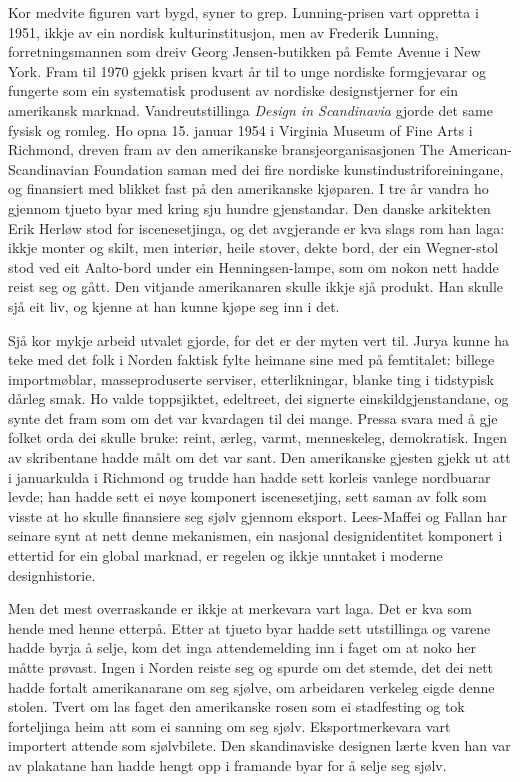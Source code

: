 Kor medvite figuren vart bygd, syner to grep. Lunning-prisen vart oppretta i 1951, ikkje av ein nordisk kulturinstitusjon, men av Frederik Lunning, forretningsmannen som dreiv Georg Jensen-butikken på Femte Avenue i New York. Fram til 1970 gjekk prisen kvart år til to unge nordiske formgjevarar og fungerte som ein systematisk produsent av nordiske designstjerner for ein amerikansk marknad. Vandreutstillinga \textit{Design in Scandinavia} gjorde det same fysisk og romleg. Ho opna 15. januar 1954 i Virginia Museum of Fine Arts i Richmond, dreven fram av den amerikanske bransjeorganisasjonen The American-Scandinavian Foundation saman med dei fire nordiske kunstindustriforeiningane, og finansiert med blikket fast på den amerikanske kjøparen. I tre år vandra ho gjennom tjueto byar med kring sju hundre gjenstandar. Den danske arkitekten Erik Herløw stod for iscenesetjinga, og det avgjerande er kva slags rom han laga: ikkje monter og skilt, men interiør, heile stover, dekte bord, der ein Wegner-stol stod ved eit Aalto-bord under ein Henningsen-lampe, som om nokon nett hadde reist seg og gått. Den vitjande amerikanaren skulle ikkje sjå produkt. Han skulle sjå eit liv, og kjenne at han kunne kjøpe seg inn i det.

Sjå kor mykje arbeid utvalet gjorde, for det er der myten vert til. Jurya kunne ha teke med det folk i Norden faktisk fylte heimane sine med på femtitalet: billege importmøblar, masseproduserte serviser, etterlikningar, blanke ting i tidstypisk dårleg smak. Ho valde toppsjiktet, edeltreet, dei signerte einskildgjenstandane, og synte det fram som om det var kvardagen til dei mange. Pressa svara med å gje folket orda dei skulle bruke: reint, ærleg, varmt, menneskeleg, demokratisk. Ingen av skribentane hadde målt om det var sant. Den amerikanske gjesten gjekk ut att i januarkulda i Richmond og trudde han hadde sett korleis vanlege nordbuarar levde; han hadde sett ei nøye komponert iscenesetjing, sett saman av folk som visste at ho skulle finansiere seg sjølv gjennom eksport. Lees-Maffei og Fallan har seinare synt at nett denne mekanismen, ein nasjonal designidentitet komponert i ettertid for ein global marknad, er regelen og ikkje unntaket i moderne designhistorie\autocite{fallan2016designing}.

Men det mest overraskande er ikkje at merkevara vart laga. Det er kva som hende med henne etterpå. Etter at tjueto byar hadde sett utstillinga og varene hadde byrja å selje, kom det inga attendemelding inn i faget om at noko her måtte prøvast. Ingen i Norden reiste seg og spurde om det stemde, det dei nett hadde fortalt amerikanarane om seg sjølve, om arbeidaren verkeleg eigde denne stolen. Tvert om las faget den amerikanske rosen som ei stadfesting og tok forteljinga heim att som ei sanning om seg sjølv. Eksportmerkevara vart importert attende som sjølvbilete. Den skandinaviske designen lærte kven han var av plakatane han hadde hengt opp i framande byar for å selje seg sjølv.

